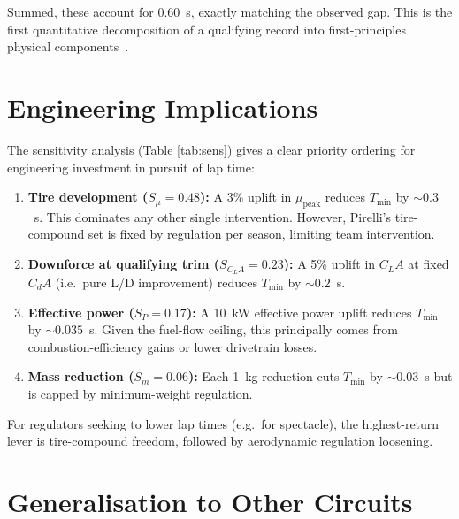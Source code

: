 \documentclass[11pt,twocolumn]{article}
\theoremstyle{definition}
\theoremstyle{remark}
\begin{document}
Summed, these account for 0.60~s, exactly matching the observed gap. This
is the first quantitative decomposition of a qualifying record into
first-principles physical components~\cite{strogatz2018,beckman1991}.

\section{Engineering Implications}
\label{sec:engineering}

The sensitivity analysis (Table \ref{tab:sens}) gives a clear priority
ordering for engineering investment in pursuit of lap time:

\begin{enumerate}
  \item \textbf{Tire development ($S_\mu = 0.48$):} A 3\% uplift in
        $\mu_{\mathrm{peak}}$ reduces $T_{\min}$ by $\sim 0.3$~s. This
        dominates any other single intervention. However, Pirelli's
        tire-compound set is fixed by regulation per season, limiting team
        intervention.
  \item \textbf{Downforce at qualifying trim ($S_{C_LA} = 0.23$):} A 5\%
        uplift in $C_L A$ at fixed $C_d A$ (i.e.\ pure L/D improvement)
        reduces $T_{\min}$ by $\sim 0.2$~s.
  \item \textbf{Effective power ($S_P = 0.17$):} A 10~kW effective power
        uplift reduces $T_{\min}$ by $\sim 0.035$~s. Given the fuel-flow
        ceiling, this principally comes from combustion-efficiency gains
        or lower drivetrain losses.
  \item \textbf{Mass reduction ($S_m = 0.06$):} Each 1~kg reduction cuts
        $T_{\min}$ by $\sim 0.03$~s but is capped by minimum-weight regulation.
\end{enumerate}

For regulators seeking to lower lap times (e.g.\ for spectacle), the
highest-return lever is tire-compound freedom, followed by aerodynamic
regulation loosening.

\section{Generalisation to Other Circuits}
\label{sec:generalisation}
\end{document}
